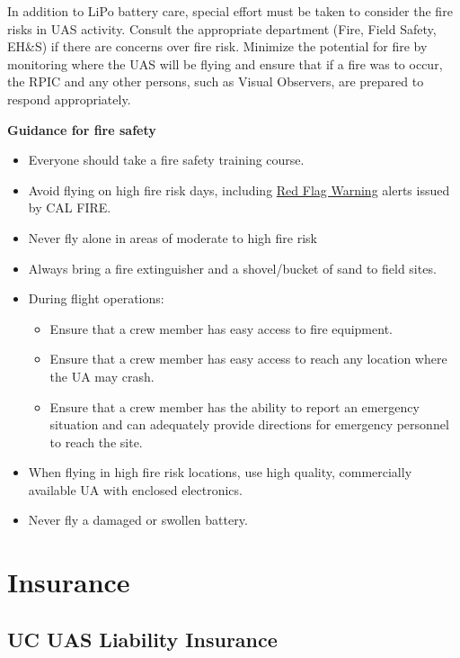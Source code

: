 \documentclass[
]{book}
\providecommand{\tightlist}{%
  \setlength{\itemsep}{0pt}\setlength{\parskip}{0pt}}
\begin{document}
In addition to LiPo battery care, special effort must be taken to consider the fire risks in UAS activity. Consult the appropriate department (Fire, Field Safety, EH\&S) if there are concerns over fire risk. Minimize the potential for fire by monitoring where the UAS will be flying and ensure that if a fire was to occur, the RPIC and any other persons, such as Visual Observers, are prepared to respond appropriately.

\textbf{Guidance for fire safety}

\begin{itemize}
\item
  Everyone should take a fire safety training course.
\item
  Avoid flying on high fire risk days, including \href{https://www.fire.ca.gov/programs/communications/red-flag-warnings-fire-weather-watches/}{Red Flag Warning} alerts issued by CAL FIRE.
\item
  Never fly alone in areas of moderate to high fire risk
\item
  Always bring a fire extinguisher and a shovel/bucket of sand to field sites.
\item
  During flight operations:

  \begin{itemize}
  \tightlist
  \item
    Ensure that a crew member has easy access to fire equipment.
  \item
    Ensure that a crew member has easy access to reach any location where the UA may crash.
  \item
    Ensure that a crew member has the ability to report an emergency situation and can adequately provide directions for emergency personnel to reach the site.
  \end{itemize}
\item
  When flying in high fire risk locations, use high quality, commercially available UA with enclosed electronics.
\item
  Never fly a damaged or swollen battery.
\end{itemize}

\hypertarget{part-insurance}{%
\part{Insurance}\label{part-insurance}}

\hypertarget{ch-liability-insurance}{%
\chapter{UC UAS Liability Insurance}\label{ch-liability-insurance}}
\end{document}
